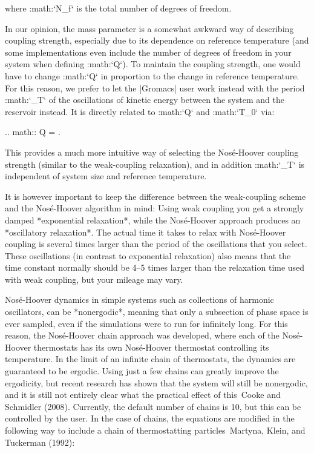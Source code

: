 where :math:`N_f` is the total number of degrees of freedom.

In our opinion, the mass parameter is a somewhat awkward way of
describing coupling strength, especially due to its dependence on
reference temperature (and some implementations even include the number
of degrees of freedom in your system when defining :math:`Q`). To
maintain the coupling strength, one would have to change :math:`Q` in
proportion to the change in reference temperature. For this reason, we
prefer to let the |Gromacs| user work instead with the period
:math:`\tau_T` of the oscillations of kinetic energy between the system
and the reservoir instead. It is directly related to :math:`Q` and
:math:`T_0` via:

.. math:: Q = .

This provides a much more intuitive way of selecting the Nosé-Hoover
coupling strength (similar to the weak-coupling relaxation), and in
addition :math:`\tau_T` is independent of system size and reference
temperature.

It is however important to keep the difference between the weak-coupling
scheme and the Nosé-Hoover algorithm in mind: Using weak coupling you
get a strongly damped *exponential relaxation*, while the Nosé-Hoover
approach produces an *oscillatory relaxation*. The actual time it takes
to relax with Nosé-Hoover coupling is several times larger than the
period of the oscillations that you select. These oscillations (in
contrast to exponential relaxation) also means that the time constant
normally should be 4–5 times larger than the relaxation time used with
weak coupling, but your mileage may vary.

Nosé-Hoover dynamics in simple systems such as collections of harmonic
oscillators, can be *nonergodic*, meaning that only a subsection of
phase space is ever sampled, even if the simulations were to run for
infinitely long. For this reason, the Nosé-Hoover chain approach was
developed, where each of the Nosé-Hoover thermostats has its own
Nosé-Hoover thermostat controlling its temperature. In the limit of an
infinite chain of thermostats, the dynamics are guaranteed to be
ergodic. Using just a few chains can greatly improve the ergodicity, but
recent research has shown that the system will still be nonergodic, and
it is still not entirely clear what the practical effect of this Cooke
and Schmidler (2008). Currently, the default number of chains is 10, but
this can be controlled by the user. In the case of chains, the equations
are modified in the following way to include a chain of thermostatting
particles Martyna, Klein, and Tuckerman (1992):

